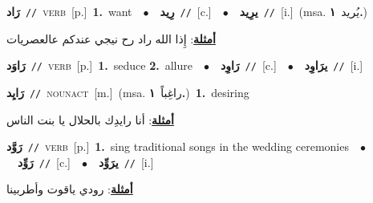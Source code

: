 \documentclass[10pt,a4paper,twoside]{article} %
\begin{document}
\begin{multicols}{2}
{\setlength\topsep{0pt}\textbf{\foreignlanguage{arabic}{رَاد}}\ {\color{gray}\texttt{//}\color{black}}\ \textsc{verb}\ [p.]\ \textbf{1.}~want\ \ $\bullet$\ \ \setlength\topsep{0pt}\textbf{\foreignlanguage{arabic}{رِيد}}\ {\color{gray}\texttt{//}\color{black}}\ [c.]\ \ $\bullet$\ \ \setlength\topsep{0pt}\textbf{\foreignlanguage{arabic}{يرِيد}}\ {\color{gray}\texttt{//}\color{black}}\ [i.]\ \color{gray}(msa. \foreignlanguage{arabic}{يُريد}~\foreignlanguage{arabic}{\textbf{١.}})\color{black}\  \begin{flushright}\color{gray}\foreignlanguage{arabic}{\textbf{\underline{\foreignlanguage{arabic}{أمثلة}}}: إِذا الله راد رح نيجي عندكم عالعصريات}\end{flushright}\color{black}} \vspace{2mm}

{\setlength\topsep{0pt}\textbf{\foreignlanguage{arabic}{رَاوَد}}\ {\color{gray}\texttt{//}\color{black}}\ \textsc{verb}\ [p.]\ \textbf{1.}~seduce  \textbf{2.}~allure\ \ $\bullet$\ \ \setlength\topsep{0pt}\textbf{\foreignlanguage{arabic}{رَاوِد}}\ {\color{gray}\texttt{//}\color{black}}\ [c.]\ \ $\bullet$\ \ \setlength\topsep{0pt}\textbf{\foreignlanguage{arabic}{يرَاوِد}}\ {\color{gray}\texttt{//}\color{black}}\ [i.]\ } \vspace{2mm}

{\setlength\topsep{0pt}\textbf{\foreignlanguage{arabic}{رَايِد}}\ {\color{gray}\texttt{//}\color{black}}\ \textsc{noun\textunderscore act}\ [m.]\ \color{gray}(msa. \foreignlanguage{arabic}{راغِباً}~\foreignlanguage{arabic}{\textbf{١.}})\color{black}\ \textbf{1.}~desiring\  \begin{flushright}\color{gray}\foreignlanguage{arabic}{\textbf{\underline{\foreignlanguage{arabic}{أمثلة}}}: أنا رايدِك بالحلال يا بنت الناس}\end{flushright}\color{black}} \vspace{2mm}

{\setlength\topsep{0pt}\textbf{\foreignlanguage{arabic}{رَوَّد}}\ {\color{gray}\texttt{//}\color{black}}\ \textsc{verb}\ [p.]\ \textbf{1.}~sing traditional songs in the wedding ceremonies\ \ $\bullet$\ \ \setlength\topsep{0pt}\textbf{\foreignlanguage{arabic}{رَوِّد}}\ {\color{gray}\texttt{//}\color{black}}\ [c.]\ \ $\bullet$\ \ \setlength\topsep{0pt}\textbf{\foreignlanguage{arabic}{يرَوِّد}}\ {\color{gray}\texttt{//}\color{black}}\ [i.]\  \begin{flushright}\color{gray}\foreignlanguage{arabic}{\textbf{\underline{\foreignlanguage{arabic}{أمثلة}}}: رودي ياقوت وأطربينا}\end{flushright}\color{black}} \vspace{2mm}


\end{multicols}
\end{document}
